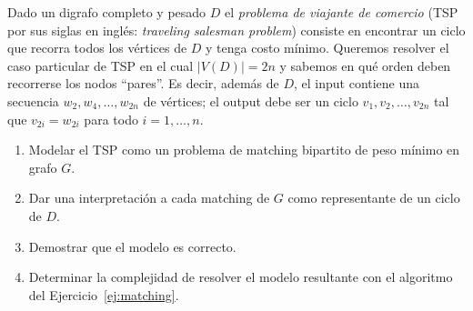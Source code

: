 

\item Dado un digrafo completo y pesado $D$ el \emph{problema de viajante de comercio} (TSP por sus siglas en inglés: \emph{traveling salesman problem}) consiste en encontrar un ciclo que recorra todos los vértices de $D$ y tenga costo mínimo. Queremos resolver el caso particular de TSP en el cual $|V(D)| = 2n$ y sabemos en qué orden deben recorrerse los nodos ``pares''. Es decir, además de $D$, el input contiene una secuencia $w_2, w_4, \ldots, w_{2n}$ de vértices; el output debe ser un ciclo $v_1, v_2, \ldots, v_{2n}$ tal que $v_{2i} = w_{2i}$ para todo $i = 1, \ldots, n$.

\begin{enumerate}[label=$\alph*)$,ref=$\alph*)$]
 \item Modelar el TSP como un problema de matching bipartito de peso mínimo en grafo $G$.
 \item Dar una interpretación a cada matching de $G$ como representante de un ciclo de $D$.
 \item Demostrar que el modelo es correcto.
 \item Determinar la complejidad de resolver el modelo resultante con el algoritmo del Ejercicio~\ref{ej:matching}.
\end{enumerate}

